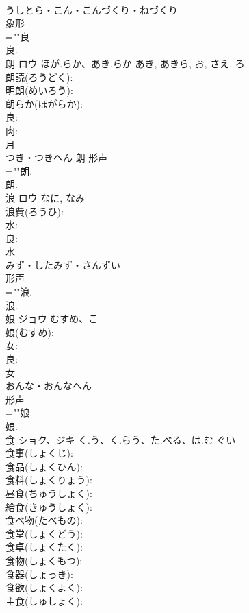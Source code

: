 \documentclass[8pt]{extreport}
\begin{document}
\begin{CJK}{UTF8}{min}
\\	うしとら・こん・こんづくり・ねづくり	
\\	象形 
\\	=""良.
\\	良.
\\	朗	ロウ	ほが.らか、あき.らか	あき, あきら, お, さえ, ろ	
\\	朗読(ろうどく): 
\\	明朗(めいろう): 
\\	朗らか(ほがらか): 
\\	良: 
\\	肉: 
\\	月	
\\	つき・つきへん	朗	形声 
\\	=""朗.
\\	朗.
\\	浪	ロウ		なに, なみ	
\\	浪費(ろうひ): 
\\	水: 
\\	良: 
\\	水	
\\	みず・したみず・さんずい	
\\	形声 
\\	=""浪.
\\	浪.
\\	娘	ジョウ	むすめ、こ		
\\	娘(むすめ): 
\\	女: 
\\	良: 
\\	女	
\\	おんな・おんなへん	
\\	形声 
\\	=""娘.
\\	娘.
\\	食	ショク、ジキ	く.う、く.らう、た.べる、は.む	ぐい	
\\	食事(しょくじ): 
\\	食品(しょくひん): 
\\	食料(しょくりょう): 
\\	昼食(ちゅうしょく): 
\\	給食(きゅうしょく): 
\\	食べ物(たべもの): 
\\	食堂(しょくどう): 
\\	食卓(しょくたく): 
\\	食物(しょくもつ): 
\\	食器(しょっき): 
\\	食欲(しょくよく): 
\\	主食(しゅしょく): 

\end{CJK}
\end{document}
